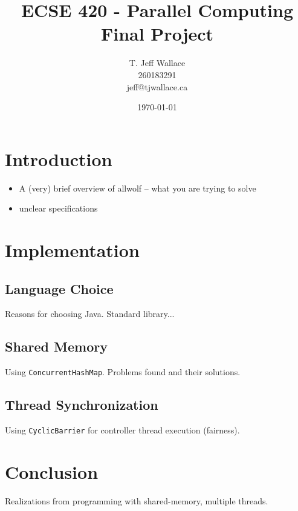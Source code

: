 \documentclass[10pt]{article}
\begin{document}
\title{ECSE 420 - Parallel Computing \\ Final Project}
\author{T. Jeff Wallace \\ 260183291 \\ jeff@tjwallace.ca}
\date{\today}
\maketitle
\clearpage

\tableofcontents
\lstlistoflistings
\clearpage


\section{Introduction}\label{intro}
\begin{itemize}
	\item A (very) brief overview of allwolf -- what you are trying to solve
	\item unclear specifications
\end{itemize}

\section{Implementation}\label{impl}
\subsection{Language Choice}\label{language}
Reasons for choosing Java.  Standard library...

\subsection{Shared Memory}\label{sharedMemory}
Using {\tt ConcurrentHashMap}.  Problems found and their solutions.

\subsection{Thread Synchronization}\label{threadSync}
Using {\tt CyclicBarrier} for controller thread execution (fairness).

\section{Conclusion}\label{conclusion}
Realizations from programming with shared-memory, multiple threads.
\end{document}
